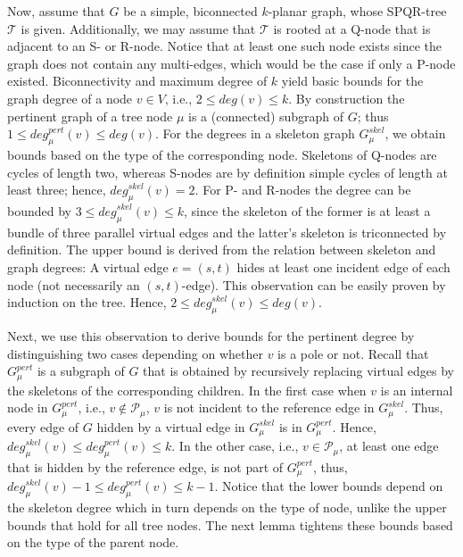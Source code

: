 \documentclass[a4paper,twoside,11pt]{article}
\newcommand{\skel}[1]{G^\textit{skel}_{#1}}
\newcommand{\pert}[1]{G^\textit{pert}_{#1}}
\newcommand{\gdeg}[1]{\textit{deg}(#1)}
\newcommand{\pdeg}[2]{\textit{deg}^{\textit{pert}}_{#1}(#2)}
\newcommand{\sdeg}[2]{\textit{deg}^{\textit{skel}}_{#1}(#2)}
\newcommand{\poles}[1]{\mathcal{P}_{#1}}
\begin{document}
Now, assume that $G$ be a simple, biconnected $k$-planar graph,
whose SPQR-tree $\mathcal{T}$ is given. Additionally, we may assume
that $\mathcal{T}$ is rooted at a Q-node that is adjacent to an S-
or R-node. Notice that at least one such node exists since the graph
does not contain any multi-edges, which would be the case if only a
P-node existed. Biconnectivity and maximum degree of $k$ yield basic
bounds for the graph degree of a node $v \in V$, i.e., $2 \leq
\gdeg{v} \leq k$. By construction the pertinent graph of a tree node
$\mu$ is a (connected) subgraph of $G$; thus $1 \leq \pdeg{\mu}{v}
\leq \gdeg{v}$. For the degrees in a skeleton graph $\skel{\mu}$, we
obtain bounds based on the type of the corresponding node. Skeletons
of Q-nodes are cycles of length two, whereas S-nodes are by
definition simple cycles of length at least three; hence,
$\sdeg{\mu}{v} = 2$. For P- and R-nodes the degree can be bounded by
$3 \leq \sdeg{\mu}{v} \leq k$, since the skeleton of the former is
at least a bundle of three parallel virtual edges and the latter's
skeleton is triconnected by definition. The upper bound is derived
from the relation between skeleton and graph degrees: A virtual edge
$e= (s, t)$ hides at least one incident edge of each node (not
necessarily an $(s, t)$-edge). This observation can be easily proven
by induction on the tree. Hence, $2 \leq \sdeg{\mu}{v} \leq
\gdeg{v}$.

Next, we use this observation to derive bounds for the pertinent
degree by distinguishing two cases depending on whether $v$ is a
pole or not. Recall that $\pert{\mu}$ is a subgraph of $G$ that is
obtained by recursively replacing virtual edges by the skeletons of
the corresponding children. In the first case when $v$ is an
internal node in $\pert{\mu}$, i.e., $v \notin \poles{\mu}$, $v$ is
not incident to the reference edge in $\skel{\mu}$. Thus, every edge
of $G$ hidden by a virtual edge in $\skel{\mu}$ is in $\pert{\mu}$.
Hence, $\sdeg{\mu}{v} \leq \pdeg{\mu}{v} \leq k$. In the other case,
i.e., $v \in \mathcal{P}_\mu$, at least one edge that is hidden by
the reference edge, is not part of $\pert{\mu}$, thus,
$\sdeg{\mu}{v} - 1 \leq \pdeg{\mu}{v} \leq k - 1$. Notice that the
lower bounds depend on the skeleton degree which in turn depends on
the type of node, unlike the upper bounds that hold for all tree
nodes. The next lemma tightens these bounds based on the type of the
parent node.
\end{document}
